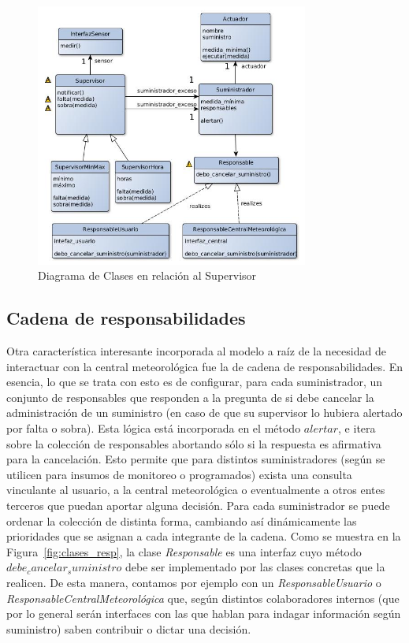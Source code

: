 \begin{figure}[h!]
  \centering
  \includegraphics[width=0.8\textwidth]{./imagenes/clases2.jpg}
  \caption{Diagrama de Clases en relación al Supervisor}
  \label{fig:clases_sup}
\end{figure}

\subsection{Cadena de responsabilidades}

Otra característica interesante incorporada al modelo a raíz de la necesidad de interactuar con la central meteorológica fue la de cadena de responsabilidades. En esencia, lo que se trata con esto es de configurar, para cada suministrador, un conjunto de responsables que responden a la pregunta de si debe cancelar la administración de un suministro (en caso de que su supervisor lo hubiera alertado por falta o sobra). Esta lógica está incorporada en el método $alertar$, e itera sobre la colección de responsables abortando sólo si la respuesta es afirmativa para la cancelación. Esto permite que para distintos suministradores (según se utilicen para insumos de monitoreo o programados) exista una consulta vinculante al usuario, a la central meteorológica o eventualmente a otros entes terceros que puedan aportar alguna decisión. Para cada suministrador se puede ordenar la colección de distinta forma, cambiando así dinámicamente las prioridades que se asignan a cada integrante de la cadena. Como se muestra en la Figura~\ref{fig:clases_resp}, la clase \textsl{Responsable} es una interfaz cuyo método $debe_cancelar_suministro$ debe ser implementado por las clases concretas que la realicen. De esta manera, contamos por ejemplo con un \textsl{ResponsableUsuario} o \textsl{ResponsableCentralMeteorológica} que, según distintos colaboradores internos (que por lo general serán interfaces con las que hablan para indagar información según suministro) saben contribuir o dictar una decisión. 

